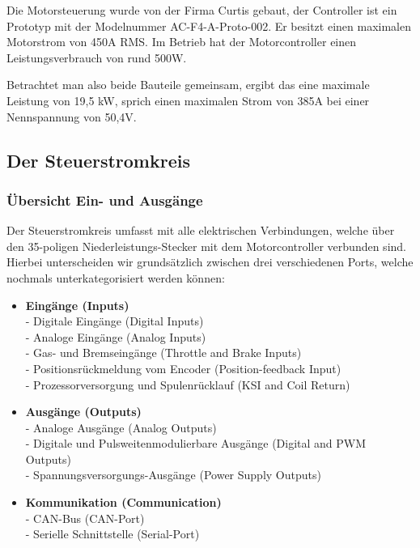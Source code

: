 Die Motorsteuerung wurde von der Firma Curtis gebaut, der Controller ist ein Prototyp mit der Modelnummer \glqq AC-F4-A-Proto-002\grqq{}. Er besitzt einen maximalen Motorstrom von 450A RMS. Im Betrieb hat der Motorcontroller einen Leistungsverbrauch von rund 500W.

Betrachtet man also beide Bauteile gemeinsam, ergibt das eine maximale Leistung von 19,5 kW, sprich einen maximalen Strom von 385A bei einer Nennspannung von 50,4V. 

\newpage


\subsection{Der Steuerstromkreis}
\subsubsection{Übersicht Ein- und Ausgänge}
Der Steuerstromkreis umfasst mit alle elektrischen Verbindungen, welche über den  35-poligen Niederleistungs-Stecker mit dem Motorcontroller verbunden sind. Hierbei unterscheiden wir grundsätzlich zwischen drei verschiedenen Ports, welche nochmals unterkategorisiert werden können:

\vspace{3mm}

\begin{itemize}
	\item \textbf{Eingänge (Inputs)} \medskip
	\\ - Digitale Eingänge (Digital Inputs)
	\\ - Analoge Eingänge (Analog Inputs)
	\\ - Gas- und Bremseingänge (Throttle and Brake Inputs)
	\\ - Positionsrückmeldung vom Encoder (Position-feedback Input)
	\\ - Prozessorversorgung und Spulenrücklauf (KSI and Coil Return) \medskip
	\item \textbf{Ausgänge (Outputs)} \medskip
	\\ - Analoge Ausgänge (Analog Outputs)
	\\ - Digitale und Pulsweitenmodulierbare Ausgänge (Digital and PWM Outputs)
	\\ - Spannungsversorgungs-Ausgänge (Power Supply Outputs) \medskip
	\item \textbf{Kommunikation (Communication)} \medskip
	\\ -  CAN-Bus (CAN-Port)
	\\ -  Serielle Schnittstelle (Serial-Port)
\end{itemize}

